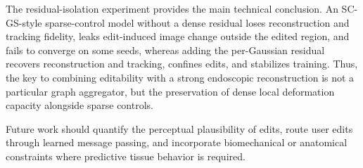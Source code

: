 \documentclass[AMA,Times1COL]{WileyNJDv5} %
\begin{document}
The residual-isolation experiment provides the main technical conclusion. An SC-GS-style sparse-control model without a dense residual loses reconstruction and tracking fidelity, leaks edit-induced image change outside the edited region, and fails to converge on some seeds, whereas adding the per-Gaussian residual recovers reconstruction and tracking, confines edits, and stabilizes training. Thus, the key to combining editability with a strong endoscopic reconstruction is not a particular graph aggregator, but the preservation of dense local deformation capacity alongside sparse controls.

Future work should quantify the perceptual plausibility of edits, route user edits through learned message passing, and incorporate biomechanical or anatomical constraints where predictive tissue behavior is required.











\end{document}
